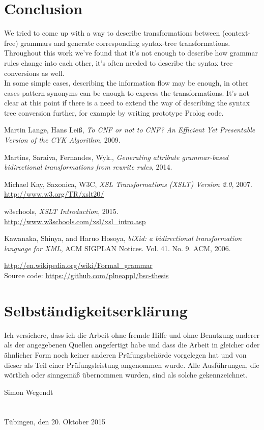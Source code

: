 \documentclass[a4paper]{article}
\begin{document}
\section{Conclusion}
We tried to come up with a way to describe transformations between (context-free) grammars and generate corresponding syntax-tree transformations. Throughout this work we've found that it's not enough to describe how grammar rules change into each other, it's often needed to describe the syntax tree conversions as well.\\
In some simple cases, describing the information flow may be enough, in other cases pattern synonyms can be enough to express the transformations. It's not clear at this point if there is a need to extend the way of describing the syntax tree conversion further, for example by writing prototype Prolog code.

\begin{thebibliography}{9}
  Martin Lange, Hans Leiß, \emph{To CNF or not to CNF? An Efficient Yet Presentable Version of the CYK Algorithm}, 2009.

  Martins, Saraiva, Fernandes, Wyk., \emph{Generating attribute grammar-based bidirectional transformations from rewrite rules}, 2014.

  Michael Kay, Saxonica, W3C, \emph{XSL Transformations (XSLT) Version 2.0}, 2007. \url{http://www.w3.org/TR/xslt20/}

  w3schools, \emph{XSLT Introduction}, 2015. \url{http://www.w3schools.com/xsl/xsl_intro.asp}

  Kawanaka, Shinya, and Haruo Hosoya, \emph{biXid: a bidirectional transformation language for XML}, ACM SIGPLAN Notices. Vol. 41. No. 9. ACM, 2006.

\end{thebibliography}
\url{http://en.wikipedia.org/wiki/Formal_grammar}\\
Source code: \url{https://github.com/plneappl/bsc-thesis}
\pagebreak
\section*{Selbständigkeitserklärung}
Ich versichere, dass ich die Arbeit ohne fremde Hilfe und ohne Benutzung
anderer als der angegebenen Quellen angefertigt habe und dass die Arbeit in
gleicher oder ähnlicher Form noch keiner anderen Prüfungsbehörde vorgelegen
hat und von dieser als Teil einer Prüfungsleistung angenommen wurde.
Alle Ausführungen, die wörtlich oder sinngemäß übernommen wurden, sind als
solche gekennzeichnet.\vspace*{7cm}

Simon Wegendt\\\\\\
Tübingen, den 20. Oktober 2015
\end{document}
